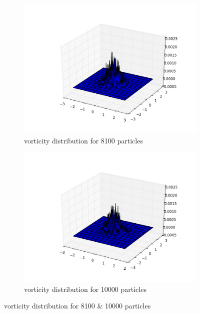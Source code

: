 \documentclass[a4paper,11pt]{article}
\begin{document}
\begin{figure}[h]
	\centering
	\begin{subfigure}[h]{.5\textwidth}
  		\centering
  		\includegraphics[width=.8\linewidth]{vorticity_distribution_for_8100_particles.png}
  		\caption{vorticity distribution for 8100 particles}
  		\label{fig:81}
	\end{subfigure}%
	\begin{subfigure}[h]{.5\textwidth}
  		\centering
  		\includegraphics[width=.8\linewidth]{vorticity_distribution_for_10000_particles.png}
  		\caption{vorticity distribution for 10000 particles}
  		\label{fig:100}
	\end{subfigure}
	\label{fig:Question 1a}
  \caption{vorticity distribution for 8100 \& 10000 particles}

\end{figure}
\end{document}

